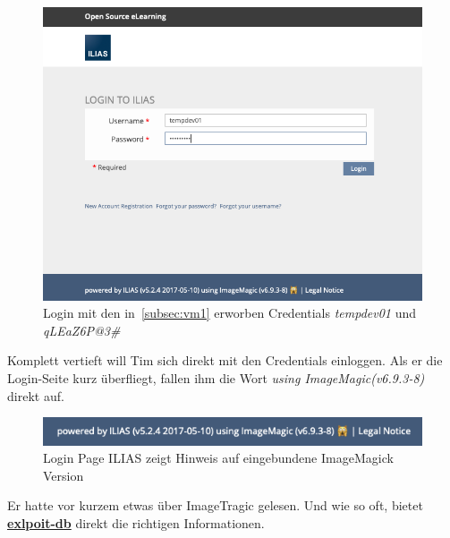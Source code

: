 \documentclass[10pt, a4paper,onecolumn ,titlepage]{article}
\begin{document}
    \begin{figure}[H]
        \centering
        \includegraphics[width=1\textwidth]{storyline_bilder_vm2/loginAlsDev01}
        \caption{Login mit den in~\ref{subsec:vm1} erworben Credentials \textit{tempdev01} und \textit{qLEaZ6P@3#}}
        \label{fig:loginAlsDev}
    \end{figure}
    
    Komplett vertieft will Tim sich direkt mit den Credentials einloggen.
    Als er die Login-Seite kurz überfliegt, fallen ihm die Wort \textit{using ImageMagic(v6.9.3-8)} direkt auf.
    \begin{figure}[H]
        \centering
        \includegraphics[width=1\textwidth]{storyline_bilder_vm2/loginPageHinweisImageMagick}
        \caption{Login Page ILIAS zeigt Hinweis auf eingebundene ImageMagick Version}
        \label{fig:loginPageHinweis}
    \end{figure}

    \noindent
    Er hatte vor kurzem etwas über ImageTragic gelesen.
    Und wie so oft, bietet \href{https://www.exploit-db.com/exploits/39767}{\textbf{exlpoit-db}} direkt die richtigen Informationen.
\end{document}
